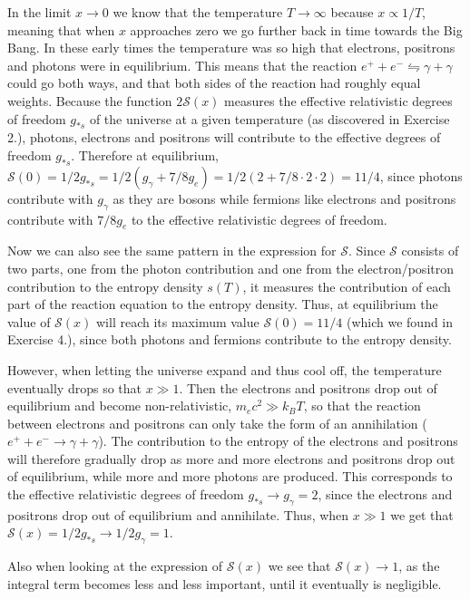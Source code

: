 \documentclass{emulateapj}
\begin{document}
	 In the limit $x\to0$ we know that the temperature $T\to\infty$ because $x\propto1/T$, meaning that when $x$ approaches zero we go further back in time towards the Big Bang. In these early times the temperature was so high that electrons, positrons and photons were in equilibrium. This means that the reaction $e^+ + e^- \leftrightharpoons \gamma + \gamma$ could go both ways, and that both sides of the reaction had roughly equal weights. Because the function $2\mathcal{S}(x)$ measures the effective relativistic degrees of freedom $g_{*s}$ of the universe at a given temperature (as discovered in Exercise 2.), photons, electrons and positrons will contribute to the effective degrees of freedom $g_{*s}$. Therefore at equilibrium, $\mathcal{S}(0) = 1/2g_{*s} = 1/2(g_\gamma + 7/8 g_e) = 1/2(2 + 7/8\cdot 2\cdot2) = 11/4$, since photons contribute with $g_\gamma$ as they are bosons while fermions like electrons and positrons contribute with $7/8g_e$ to the effective relativistic degrees of freedom. 
	 
	 Now we can also see the same pattern in the expression for $\mathcal{S}$. Since $\mathcal{S}$ consists of two parts, one from the photon contribution and one from the electron/positron contribution to the entropy density $s(T)$, it measures the contribution of each part of the reaction equation to the entropy density. Thus, at equilibrium the value of $\mathcal{S}(x)$ will reach its maximum value $\mathcal{S}(0) = 11/4$ (which we found in Exercise 4.), since both photons and fermions contribute to the entropy density. 
	 
	 However, when letting the universe expand and thus cool off, the temperature eventually drops so that $x\gg1$. Then the electrons and positrons drop out of equilibrium and become non-relativistic, $m_ec^2\gg k_BT$, so that the reaction between electrons and positrons can only take the form of an annihilation ($e^+ + e^- \to \gamma + \gamma$). The contribution to the entropy of the electrons and positrons will therefore gradually drop as more and more electrons and positrons drop out of equilibrium, while more and more photons are produced. This corresponds to the effective relativistic degrees of freedom $g_{*s}\to g_\gamma = 2$, since the electrons and positrons drop out of equilibrium and annihilate. Thus, when $x\gg1$ we get that $\mathcal{S}(x) = 1/2 g_{*s} \to 1/2g_\gamma = 1$.
	 
	 Also when looking at the expression of $\mathcal{S}(x)$ we see that $\mathcal{S}(x)\to1$, as the integral term becomes less and less important, until it eventually is negligible. 
	 
\end{document}
